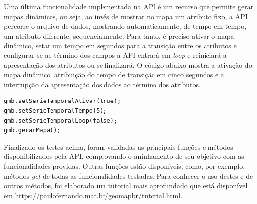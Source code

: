 \documentclass[12pt]{article}
\begin{document}
Uma última funcionalidade implementada na API é um recurso que permite gerar mapas dinâmicos, ou seja, ao invés de mostrar no mapa um atributo fixo, a API percorre o arquivo de dados, mostrando automaticamente, de tempo em tempo, um atributo diferente, sequencialmente. Para tanto, é preciso ativar o mapa dinâmico, setar um tempo em segundos para a transição entre os atributos e configurar se ao término dos campos a API entrará em \textit{loop} e reiniciará a apresentação dos atributos ou se finalizará. O código abaixo mostra a ativação do mapa dinâmico, atribuição do tempo de transição em cinco segundos e a interrupção da apresentação dos dados ao término dos atributos.  

\begin{lstlisting}
gmb.setSerieTemporalAtivar(true);
gmb.setSerieTemporalTempo(5);
gmb.setSerieTemporalLoop(false);
gmb.gerarMapa();
\end{lstlisting}

Finalizado os testes acima, foram validadas as principais funções e métodos disponibilizados pela API, comprovando o aninhamento de seu objetivo com as funcionalidades providas. Outras funções estão disponíveis, como, por exemplo, métodos \textit{get} de todas as funcionalidades testadas. Para conhecer o uso destes e de outros métodos, foi elaborado um tutorial mais aprofundado que está disponível em \href{https://paulofernando.mat.br/geomapbr/tutorial.html}{https://paulofernando.mat.br/geomapbr/tutorial.html}.
\end{document}
